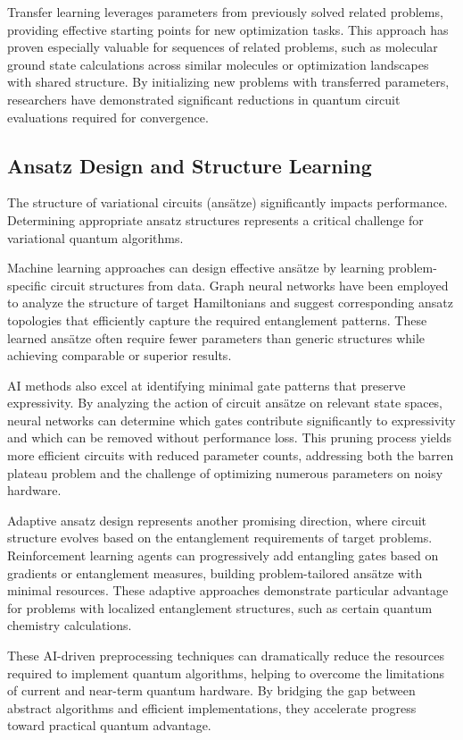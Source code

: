 Transfer learning leverages parameters from previously solved related problems, providing effective starting points for new optimization tasks. This approach has proven especially valuable for sequences of related problems, such as molecular ground state calculations across similar molecules or optimization landscapes with shared structure. By initializing new problems with transferred parameters, researchers have demonstrated significant reductions in quantum circuit evaluations required for convergence.

\subsection{Ansatz Design and Structure Learning}

The structure of variational circuits (ansätze) significantly impacts performance. Determining appropriate ansatz structures represents a critical challenge for variational quantum algorithms.

Machine learning approaches can design effective ansätze by learning problem-specific circuit structures from data. Graph neural networks have been employed to analyze the structure of target Hamiltonians and suggest corresponding ansatz topologies that efficiently capture the required entanglement patterns. These learned ansätze often require fewer parameters than generic structures while achieving comparable or superior results.

AI methods also excel at identifying minimal gate patterns that preserve expressivity. By analyzing the action of circuit ansätze on relevant state spaces, neural networks can determine which gates contribute significantly to expressivity and which can be removed without performance loss. This pruning process yields more efficient circuits with reduced parameter counts, addressing both the barren plateau problem and the challenge of optimizing numerous parameters on noisy hardware.

Adaptive ansatz design represents another promising direction, where circuit structure evolves based on the entanglement requirements of target problems. Reinforcement learning agents can progressively add entangling gates based on gradients or entanglement measures, building problem-tailored ansätze with minimal resources. These adaptive approaches demonstrate particular advantage for problems with localized entanglement structures, such as certain quantum chemistry calculations.

These AI-driven preprocessing techniques can dramatically reduce the resources required to implement quantum algorithms, helping to overcome the limitations of current and near-term quantum hardware. By bridging the gap between abstract algorithms and efficient implementations, they accelerate progress toward practical quantum advantage. 